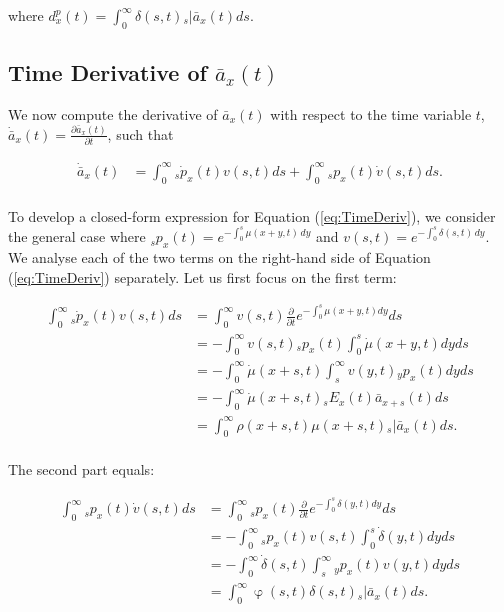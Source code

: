 \documentclass[12pt]{article}
\begin{document}
where ${d}^{p}_{x}(t)=\int_0^\infty \delta(s,t) {}_s|\bar{a}_x(t) ds$. 

\subsection{Time Derivative of $\bar{a}_x(t)$} \label{sec:timderiv}

We now compute the derivative of $\bar{a}_x(t)$ with respect to the time variable $t$, $\dot{\bar{a}} _x(t)=\frac{\partial \bar{a}_x(t)}{\partial t}$, such that

\begin{equation}\label{eq:TimeDeriv}
\begin{split}
\dot{\bar{a}} _x(t) &= \int_0^\infty {}_s\dot{p}_x(t) v(s,t)ds +\int_0^\infty {}_sp_x(t) \dot{v}(s,t)ds.\\
\end{split}
\end{equation}


To develop a closed-form expression for Equation (\ref{eq:TimeDeriv}), we consider the general case where $_s p_x(t) = e^{-\int_{0}^{s} \mu(x+y,t) \, dy}$ and ${v}(s,t) = e^{-\int_{0}^{s} \delta(s,t) \, dy}$. We analyse each of the two terms on the right-hand side of Equation (\ref{eq:TimeDeriv}) separately. Let us first focus on the first term:


\begin{equation}\label{eq:TimeDerivP1}
\begin{split}
\int_0^\infty {}_s\dot{p}_x(t) v(s,t)ds &= \int_0^\infty   v(s,t) \frac{\partial  }{\partial t}e^{-\int_0^{s}{\mu}(x+y,t)dy}ds\\
&= -\int_0^\infty   v(s,t) {}_sp_x(t)\int_0^{s}\dot{\mu}(x+y,t)dyds\\
&= -\int_0^\infty  \dot{\mu}(x+s,t) \int_s^{\infty} v(y,t) {}_yp_x(t) dyds\\
&= - \int_0^\infty \dot{\mu}(x+s,t)   {}_sE_x(t) \bar{a} _{x+s}(t) ds\\
&= \int_0^\infty \rho(x+s,t) \mu(x+s,t)   {}_s|\bar{a}_x(t) ds.\\
\end{split}
\end{equation}


The second part equals:

\begin{equation}\label{eq:TimeDerivP2}
\begin{split}
\int_0^\infty {}_sp_x(t) \dot{v}(s,t)ds &= \int_0^\infty {}_sp_x(t)  \frac{\partial  }{\partial t} e^{-\int_0^{s}{\delta}(y,t)dy}ds\\
&= -\int_0^\infty {}_sp_x(t) v(s,t) \int_0^{s}\dot{\delta}(y,t)dy ds\\
&= -\int_0^\infty  \dot{\delta}(s,t)\int_s^{\infty} {}_yp_x(t) v(y,t) dy ds\\
&= \int_0^\infty  \upvarphi(s,t) \delta(s,t)  {}_s|\bar{a}_x(t) ds.\\
\end{split}
\end{equation}
\end{document}
